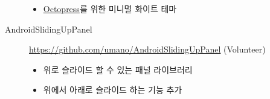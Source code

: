 \documentclass[a4paper,10pt]{article}
\begin{document}
\begin{description}
    \begin{itemize}
      \item \href{http://octopress.org}{Octopress}를 위한 미니멀 화이트 테마
    \end{itemize}
  \item[AndroidSlidingUpPanel] \url{https://github.com/umano/AndroidSlidingUpPanel} (Volunteer)
    \begin{itemize}
      \item 위로 슬라이드 할 수 있는 패널 라이브러리
      \item 위에서 아래로 슬라이드 하는 기능 추가
    \end{itemize}
\end{description}


\end{document}
